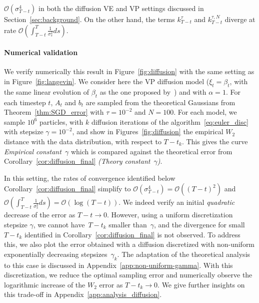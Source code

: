 \documentclass[11pt]{article}
\begin{document}
$\mathcal{O}\left(\sigma_{T-t}^4\right)$ in both the diffusion VE and VP settings discussed in Section~\ref{sec:background}.
On the other hand, the terms $k_{T-t}^\tau$ and $k_{T-t}^{\tau,N}$ diverge at rate $\mathcal{O}\left(\int_{T-t}^T \frac{1}{\sigma_s^2}ds\right)$. %



\paragraph{Numerical validation} We verify numerically this result in Figure~\ref{fig:diffusion} with the same setting as in Figure~\ref{fig:langevin}. We consider here the VP diffusion model ($\xi_t = \beta_t$, with the same linear evolution of $\beta_t$ as the one proposed by~\cite{song2020score}) and with $\alpha = 1$. For each timestep $t$, $A_{t}$ and $b_{t}$ are sampled from the theoretical Gaussians from Theorem~\ref{thm:SGD_error} with ${\tau = 10^{-2}}$ and ${N=100}$. For each model, we sample $10^6$ particles, with $k$ diffusion iterations of the algorithm~\eqref{eq:euler_disc} with stepsize $\gamma = 10^{-2}$, and show in Figures~\ref{fig:diffusion} the empirical $W_2$ distance with the data distribution, with respect to $T-t_k$. This gives the curve \emph{Empirical constant~$\gamma$} which is compared against the theoretical error from Corollary~\ref{cor:diffusion_final} \emph{(Theory constant~$\gamma$)}. 

In this setting, the rates of convergence identified below Corollary~\ref{cor:diffusion_final} simplify to $\mathcal{O}\left(\sigma_{T-t}^4\right) = \mathcal{O}((T-t)^2)$ and $\mathcal{O}\left(\int_{T-t}^T \frac{1}{\sigma_s^2}ds\right) = \mathcal{O}(\log(T-t))$. We indeed verify an initial \emph{quadratic} decrease of the error as $T-t \to 0$. However, using a uniform discretization stepsize \(\gamma\), we cannot have~\(T - t_k\) smaller than~\(\gamma\), and the divergence for small $T-t_k$ identified in Corollary~\ref{cor:diffusion_final} is not observed. To address this, we also plot the error obtained with a diffusion discretized with non-uniform exponentially decreasing stepsizes~\(\gamma_k\). The adaptation of the theoretical analysis to this case is discussed in Appendix~\ref{app:non-uniform-gamma}. With this discretization, we reduce the optimal sampling error and numerically observe the logarithmic increase of the $W_2$ error as $T-t_k \to 0$. We give further insights on this trade-off in Appendix~\ref{app:analysis_diffusion}.
\end{document}
